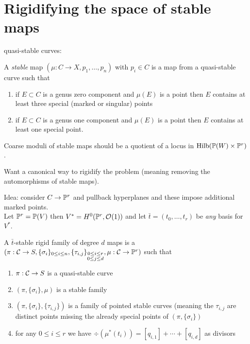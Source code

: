 \documentclass[12pt]{article}
\begin{document}
\section{Rigidifying the space of stable maps}

quasi-stable curves: 

\begin{defn}
A \textit{stable} map $(\mu : C \to X, p_1, \dots, p_n)$ with $p_i \in C$ is a map from a quasi-stable curve such that
\begin{enumerate}
\item if $E \subset C$ is a genus zero component and $\mu(E)$ is a point then $E$ contains at least three special (marked or singular) points
\item if $E \subset C$ is a genus one component and $\mu(E)$ is a point then $E$ contains at least one special point. 
\end{enumerate}
\end{defn}

Coarse moduli of stable maps should be a quotient of a locus in $\Hilb(\P(W) \times \P^r)$.

Want a canonical way to rigidify the problem (meaning removing the automorphisms of stable maps). 

Idea: consider $C \to \P^r$ and pullback hyperplanes and these impose additional marked points. 
\bigskip\\
Let $\P^r = \P(V)$ then $V^* = H^0(\P^r, \struct{}(1))$ and let $\bar{t} = (t_0, \dots, t_r)$ be \textit{any} basis for $V^*$. 

\begin{defn}
A $\bar{t}$-stable rigid family of degree $d$ maps is a $(\pi : \C \to S, \{ \sigma_i \}_{0 \le i \le n}, \{ \tau_{i,j} \}_{\substack{0 \le i \le r \\ 0 \le j \le d}}, \mu: \C \to \P^r )$ such that
\begin{enumerate}
\item $\pi : \C \to S$ is a quasi-stable curve
\item $(\pi, \{ \sigma_i \}, \mu)$ is a stable family
\item $(\pi, \{ \sigma_i \}, \{ \tau_{i,j} \})$ is a family of pointed stable curves (meaning the $\tau_{i,j}$ are distinct points missing the already special points of $(\pi, \{ \sigma_i \})$ 
\item for any $0 \le i \le r$ we have $\div(\mu^* (t_i)) = [q_{i,1}] + \cdots + [q_{i, d}]$ as divisors 
\end{enumerate}
\end{defn}
\end{document}
